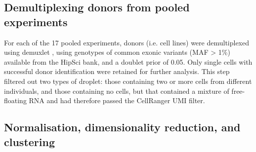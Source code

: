 
\newpage

\subsection{Demultiplexing donors from pooled experiments}

For each of the 17 pooled experiments, donors (i.e. cell lines) were demultiplexed using demuxlet \cite{kang2018multiplexed}, using genotypes of common exonic variants (MAF > 1\%) available from the HipSci bank, and a doublet prior of 0.05. 
Only single cells with successful donor identification were retained for further analysis. 
This step filtered out two types of droplet: those containing two or more cells from different individuals, and those containing no cells, but that contained a mixture of free-floating RNA and had therefore passed the CellRanger UMI filter.

\subsection{Normalisation, dimensionality reduction, and clustering}


